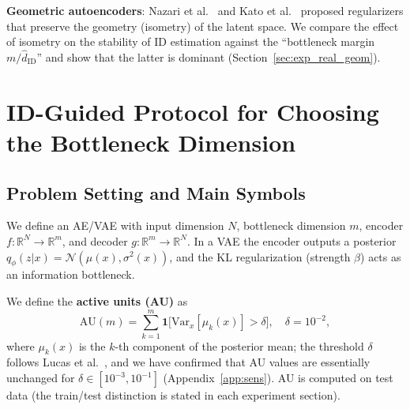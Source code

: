 \documentclass[make,article,submit,pdftex,moreauthors]{Definitions/mdpi}
\newcommand{\hatdID}{\hat{d}_{\mathrm{ID}}}
\newcommand{\R}{\mathbb{R}}
\begin{document}
\textbf{Geometric autoencoders}:
Nazari et al.~\cite{nazari2023geometric} and Kato et
al.~\cite{kato2020rdae} proposed regularizers that preserve the geometry
(isometry) of the latent space.
We compare the effect of isometry on the stability of ID estimation against
the ``bottleneck margin $m / \hatdID$'' and show that the latter is dominant
(Section~\ref{sec:exp_real_geom}).

\section{ID-Guided Protocol for Choosing the Bottleneck Dimension}\label{sec:protocol}

\subsection{Problem Setting and Main Symbols}\label{sec:protocol_setup}

We define an AE/VAE with input dimension $N$, bottleneck dimension $m$,
encoder $f: \R^N \to \R^m$, and decoder $g: \R^m \to \R^N$.
In a VAE the encoder outputs a posterior
$q_\phi(z|x) = \mathcal{N}(\mu(x), \sigma^2(x))$, and the KL regularization
(strength $\beta$) acts as an information bottleneck.

We define the \textbf{active units (AU)} as
\begin{equation}
  \mathrm{AU}(m) = \sum_{k=1}^{m} \mathbf{1}\bigl[\mathrm{Var}_x[\mu_k(x)] > \delta\bigr],
  \quad \delta = 10^{-2},
  \label{eq:au_def}
\end{equation}
where $\mu_k(x)$ is the $k$-th component of the posterior mean; the
threshold $\delta$ follows Lucas et al.~\cite{lucas2019elbo}, and we have
confirmed that AU values are essentially unchanged for
$\delta \in [10^{-3}, 10^{-1}]$ (Appendix~\ref{app:sens}).
AU is computed on test data (the train/test distinction is stated in each
experiment section).
\end{document}
